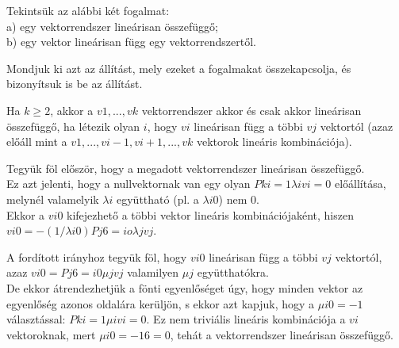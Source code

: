 \begin{frame}
  \begin{tcolorbox}[title={2. (4p)}]
     Tekintsük az alábbi két fogalmat:\\
     a) egy vektorrendszer lineárisan összefüggő;\\
     b) egy vektor lineárisan függ egy vektorrendszertől.\\
     \mmedskip
     
     Mondjuk ki azt az állítást, mely ezeket a fogalmakat összekapcsolja, és bizonyítsuk is be az állítást.
  \tcblower
  
    Ha $k \geq 2$, akkor a $v1,...,vk$ vektorrendszer akkor és csak akkor lineárisan összefüggő, ha létezik olyan $i$, hogy $vi$ lineárisan függ a többi $vj$ vektortól (azaz előáll mint a $v1,...,vi−1,vi+1,...,vk$ vektorok lineáris kombinációja).\\
    \mmedskip
    
    Tegyük föl először, hogy a megadott vektorrendszer lineárisan összefüggő.\\
    Ez azt jelenti, hogy a nullvektornak van egy olyan $Pk i=1 {\lambda}ivi = 0$ előállítása, melynél valamelyik ${\lambda}i$ együttható (pl. a ${\lambda}i0$) nem $0$.\\
    
    Ekkor a $vi0$ kifejezhető a többi vektor lineáris kombinációjaként, hiszen $vi0 = −(1/{\lambda}i0)Pj6=io {\lambda}jvj$.\\
    \mmedskip
    
    A fordított irányhoz tegyük föl, hogy $vi0$ lineárisan függ a többi $vj$ vektortól, azaz $vi0 = Pj6=i0 {\mu}jvj$ valamilyen ${\mu}j$ együtthatókra.\\
    
    De ekkor átrendezhetjük a fönti egyenlőséget úgy, hogy minden vektor az egyenlőség azonos oldalára kerüljön, s ekkor azt kapjuk, hogy a ${\mu}i0 = −1$ választással: $Pk i=1 {\mu}ivi = 0$. Ez nem triviális lineáris kombinációja a $vi$ vektoroknak, mert ${\mu}i0 = −1 6= 0$, tehát a vektorrendszer lineárisan összefüggő.
  \end{tcolorbox}
\end{frame}


